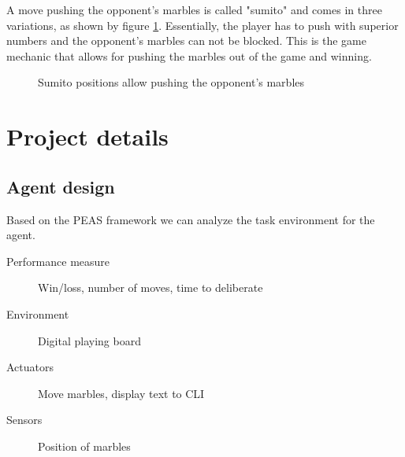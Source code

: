 \documentclass{llncs}
\begin{document}
A move pushing the opponent's marbles is called "sumito" and comes in three variations, as shown by figure \ref{sumito}. Essentially, the player has to push with superior numbers and the opponent's marbles can not be blocked. This is the game mechanic that allows for pushing the marbles out of the game and winning.

\begin{figure}[!h]
	\centering
	\hfill
	\hfill
	\caption{Sumito positions allow pushing the opponent's marbles \cite{abalone_sa_abalone_nodate}}
	\label{sumito}
\end{figure}

\section{Project details}

\subsection{Agent design}

Based on the PEAS framework we can analyze the task environment for the agent. \cite[p.107]{russell_artificial_2021}

\begin{description}
	\item[Performance measure] Win/loss, number of moves, time to deliberate
	\item[Environment] Digital playing board
	\item[Actuators] Move marbles, display text to CLI
	\item[Sensors] Position of marbles
\end{description}
\end{document}
